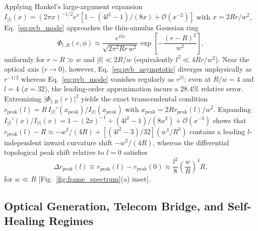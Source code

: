 \documentclass[aps,pra,onecolumn,notitlepage,11pt,tightenlines,amsmath,amssymb,floatfix,longbibliography]{revtex4-2}
\providecommand{\abs}[1]{\lvert#1\rvert}
\begin{document}
Applying Hankel's large-argument expansion $I_{\abs{l}}(x) = (2\pi x)^{-1/2} e^x [1 - (4l^2-1)/(8x) + \mathcal{O}(x^{-2})]$ with $x = 2Rr/w^2$, Eq.~\eqref{eq:pvb_mode} approaches the thin-annulus Gaussian ring~\cite{Ferreira2026}
\begin{equation}
\Phi_{l,R}(r,\phi) \approx \frac{e^{il\phi}}{\sqrt{2\pi^2 R r\, w^2}} \exp\!\left[-\frac{(r - R)^2}{w^2}\right],
\label{eq:pvb_asymptotic}
\end{equation}
uniformly for $r \sim R \gg w$ and $\abs{l} \ll 2R/w$ (equivalently $l^2 \ll 4Rr/w^2$). Near the optical axis ($r \to 0$), however, Eq.~\eqref{eq:pvb_asymptotic} diverges unphysically as $r^{-1/2}$ whereas Eq.~\eqref{eq:pvb_mode} vanishes regularly as $r^{\abs{l}}$; even at $R/w = 4$ and $l = 4$ ($x = 32$), the leading-order approximation incurs a $28.4\%$ relative error. Extremizing $\abs{\Phi_{l,R}(r)}^2$ yields the exact transcendental condition $r_{\mathrm{peak}}(l) = R\,I_{\abs{l}}'(x_{\mathrm{peak}})/I_{\abs{l}}(x_{\mathrm{peak}})$ with $x_{\mathrm{peak}} = 2R r_{\mathrm{peak}}(l)/w^2$. Expanding $I_{\abs{l}}'(x)/I_{\abs{l}}(x) = 1 - (2x)^{-1} + (4l^2-1)/(8x^2) + \mathcal{O}(x^{-3})$ shows that $r_{\mathrm{peak}}(l) - R \approx -w^2/(4R) + [(4l^2-3)/32](w^4/R^3)$ contains a leading $l$-independent inward curvature shift $-w^2/(4R)$, whereas the differential topological peak shift relative to $l = 0$ satisfies
\begin{equation}
\Delta r_{\mathrm{peak}}(l) \equiv r_{\mathrm{peak}}(l) - r_{\mathrm{peak}}(0) \approx \frac{l^2}{8}\left(\frac{w}{R}\right)^4 R,
\label{eq:peak_shift}
\end{equation}
for $w \ll R$ [Fig.~\ref{fig:frame_spectrum}(a) inset].

\subsection{Optical Generation, Telecom Bridge, and Self-Healing Regimes}
\label{subsec:pvb_generation}
\end{document}

